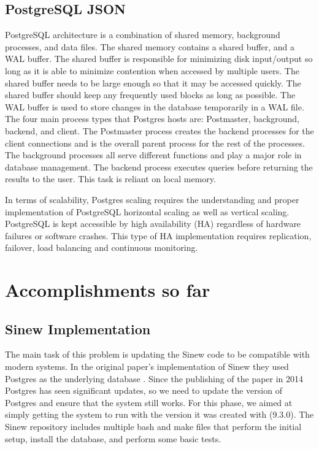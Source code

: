 \documentclass[sigconf]{acmart}
\begin{document}
   \subsection{PostgreSQL JSON}
    PostgreSQL architecture \cite{PostgresMedium} is a combination of shared memory, background processes, and data files. The shared memory contains a shared buffer, and a WAL buffer. The shared buffer is responsible for minimizing disk input/output so long as it is able to minimize contention when accessed by multiple users. The shared buffer needs to be large enough so that it may be accessed quickly. The shared buffer should keep any frequently used blocks as long as possible. The WAL buffer is used to store changes in the database temporarily in a WAL file. The four main process types that Postgres hosts are: Postmaster, background, backend, and client. The Postmaster process creates the backend processes for the client connections and is the overall parent process for the rest of the processes. The background processes all serve different functions and play a major role in database management. The backend process executes queries before returning the results to the user. This task is reliant on local memory.

    In terms of scalability, Postgres scaling\cite{Postgres-scalable} requires the understanding and proper implementation of PostgreSQL horizontal scaling as well as vertical scaling. PostgreSQL is kept accessible by high availability (HA) regardless of hardware failures or software crashes. This type of HA implementation requires replication, failover, load balancing and continuous monitoring.


\section{Accomplishments so far}
    \subsection{Sinew Implementation}
    The main task of this problem is updating the Sinew code to be compatible with modern systems. In the original paper's implementation of Sinew they used Postgres as the underlying database \cite{Tahara_Diamond_Abadi_2014}. Since the publishing of the paper in 2014 Postgres has seen significant updates, so we need to update the version of Postgres and ensure that the system still works. For this phase, we aimed at simply getting the system to run with the version it was created with (9.3.0). The Sinew repository includes multiple bash and make files that perform the initial setup, install the database, and perform some basic tests.
\end{document}
